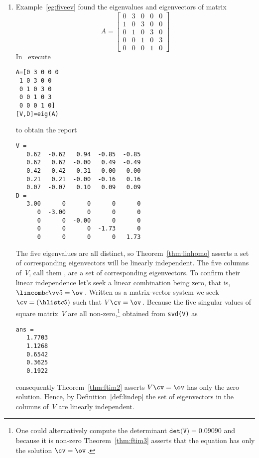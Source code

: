 \begin{example}
\begin{enumerate}
\item\label{eg:indepeva} Example~\ref{eg:fiveev} found the eigenvalues and eigenvectors of matrix
\begin{equation*}
A=\begin{bmatrix}0&3&0&0&0
\\1&0&3&0&0
\\0&1&0&3&0
\\0&0&1&0&3
\\0&0&0&1&0\end{bmatrix}
\end{equation*}
In \script\ execute
\begin{verbatim}
A=[0 3 0 0 0
 1 0 3 0 0
 0 1 0 3 0
 0 0 1 0 3
 0 0 0 1 0]
[V,D]=eig(A)
\end{verbatim}
\setbox\ajrqrbox\hbox{}%
\marginpar{\usebox{\ajrqrbox}}%
to obtain the report \twodp
\begin{verbatim}
V =
   0.62  -0.62   0.94  -0.85  -0.85
   0.62   0.62  -0.00   0.49  -0.49
   0.42  -0.42  -0.31  -0.00   0.00
   0.21   0.21  -0.00  -0.16   0.16
   0.07  -0.07   0.10   0.09   0.09
D =
   3.00      0      0      0      0
      0  -3.00      0      0      0
      0      0  -0.00      0      0
      0      0      0  -1.73      0
      0      0      0      0   1.73
\end{verbatim}
The five eigenvalues are all distinct, so Theorem~\ref{thm:linhomo} asserts a set of corresponding eigenvectors will be linearly independent.
The five columns of~\(V\), call them \hlist{}, are a set of corresponding eigenvectors.
To confirm their linear independence let's seek a linear combination being zero, that is, \(\lincomb c\vv5=\ov\)\,.
Written as a matrix-vector system we seek \(\cv=(\hlist c5)\) such that \(V\cv=\ov\)\,.
Because the five singular values of square matrix~\(V\) are all non-zero,\footnote{One could alternatively compute the determinant \(\texttt{det(V)}=0.09090\) and because it is non-zero Theorem~\ref{thm:ftim3} asserts that the equation has only the solution \(\cv=\ov\)\,.} obtained from \verb|svd(V)| as
\begin{verbatim}
ans =
   1.7703
   1.1268
   0.6542
   0.3625
   0.1922
\end{verbatim}
consequently Theorem~\ref{thm:ftim2} asserts \(V\cv=\ov\) has only the zero solution.
Hence, by Definition~\ref{def:lindep} the set of eigenvectors in the columns of~\(V\) are linearly independent. 

\end{enumerate}
\end{example}


